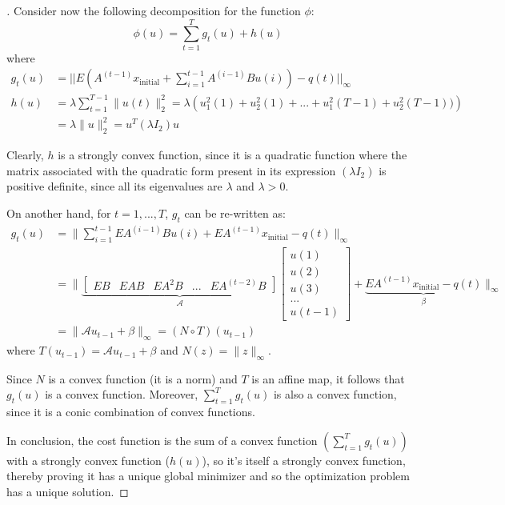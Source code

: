 \documentclass[12pt]{article}
\begin{document}
\begin{proof}[\unskip\nopunct]
Consider now the following decomposition for the function $\phi$:
\[  
    \phi(u) =  \sum_{t=1}^{T} g_t(u) + h(u)
\]
where 
\vspace{-0.5em}
\begin{align*}
    g_t(u) &= ||E (A^{(t-1)} x_{\text{initial}} + \sum_{i=1}^{t-1} A^{(i-1)} B u(i)) - q(t)||_{\infty} \\
    h(u) &= \lambda \sum_{t=1}^{T-1} \|u(t)\|_{2}^2 = 
    \lambda \left( u_1^2(1)+ u_2^2(1) + ... + u_1^2(T - 1)+ u_2^2(T - 1))\right) \\
    &=  \lambda \|u\|_2^2 = u^T (\lambda I_2) u
\end{align*}

Clearly, $h$ is a strongly convex function, since it is a quadratic function where the matrix associated with the quadratic form present in its expression $(\lambda I_2)$ is positive definite, since all its eigenvalues are $\lambda$ and $\lambda > 0$. \par
On another hand, for $t = 1, ..., T$, $g_t$ can be re-written as:
\begin{align*}
    g_t(u) &= \bigg\|\sum_{i=1}^{t-1} EA^{(i-1)} B u(i) + EA^{(t-1)} x_{\text{initial}} - q(t)\bigg\|_{\infty} \\
    &= \bigg\|
    \underbrace{
    \begin{bmatrix}
        EB & EAB & EA^2B & ... & EA^{(t - 2)}B
    \end{bmatrix}
    }_{\mathcal{A}}
    \begin{bmatrix}
        u(1) \\ u(2) \\ u(3) \\ ... \\ u(t - 1)
    \end{bmatrix}
    + \underbrace{EA^{(t-1)} x_{\text{initial}} - q(t)}_{\beta}\bigg\|_{\infty} \\
    &= \| \mathcal{A}u_{t-1} + \beta \|_{\infty} = (N \circ T)(u_{t-1})
\end{align*}
where $T(u_{t-1}) = \mathcal{A}u_{t-1} + \beta$ and $N(z) = \|z\|_{\infty}$.\par
Since $N$ is a convex function (it is a norm) and $T$ is an affine map, it follows that $g_t(u)$ is a convex function. Moreover, $\sum_{t=1}^{T} g_t(u)$ is also a convex function, since it is a conic combination of convex functions.
\par
In conclusion, the cost function is the sum of a convex function $(\sum_{t=1}^{T} g_t(u))$ with a strongly convex function ($h(u)$), so it's itself a strongly convex function, thereby proving it has a unique global minimizer and so the optimization problem has a unique solution.
\end{proof}
\end{document}
